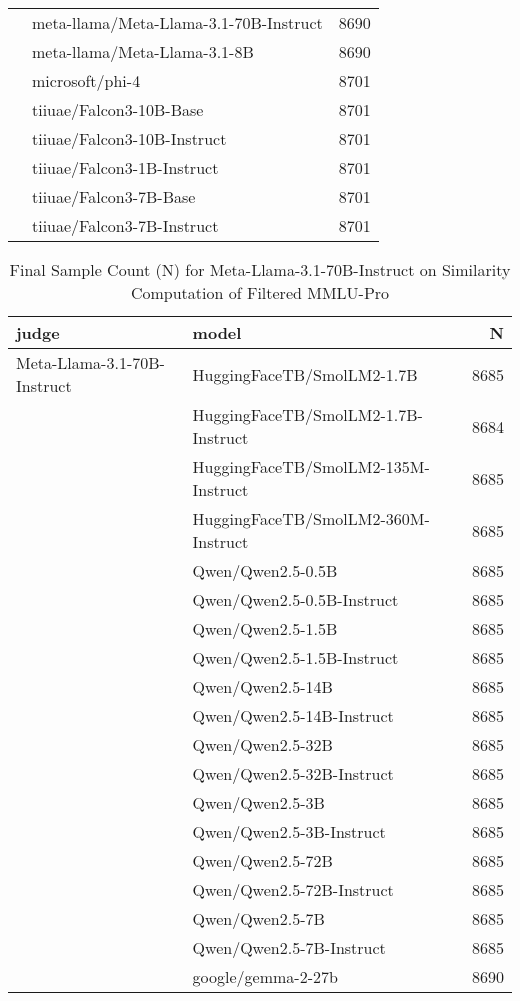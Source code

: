\begin{table}[]
\begin{tabular}{llr}
 & meta-llama/Meta-Llama-3.1-70B-Instruct & 8690 \\
 & meta-llama/Meta-Llama-3.1-8B & 8690 \\
 & microsoft/phi-4 & 8701 \\
 & tiiuae/Falcon3-10B-Base & 8701 \\
 & tiiuae/Falcon3-10B-Instruct & 8701 \\
 & tiiuae/Falcon3-1B-Instruct & 8701 \\
 & tiiuae/Falcon3-7B-Base & 8701 \\
 & tiiuae/Falcon3-7B-Instruct & 8701 \\
\bottomrule
\end{tabular}
    \label{tab:Meta-Llama-3.1-8B-Instruct}
\end{table}

\begin{table}[]
    \centering
     \caption{Final Sample Count (N) for Meta-Llama-3.1-70B-Instruct on Similarity Computation of Filtered MMLU-Pro}
\begin{tabular}{llr}
\toprule
judge & model & N \\
\midrule
Meta-Llama-3.1-70B-Instruct & HuggingFaceTB/SmolLM2-1.7B & 8685 \\
 & HuggingFaceTB/SmolLM2-1.7B-Instruct & 8684 \\
 & HuggingFaceTB/SmolLM2-135M-Instruct & 8685 \\
 & HuggingFaceTB/SmolLM2-360M-Instruct & 8685 \\
 & Qwen/Qwen2.5-0.5B & 8685 \\
 & Qwen/Qwen2.5-0.5B-Instruct & 8685 \\
 & Qwen/Qwen2.5-1.5B & 8685 \\
 & Qwen/Qwen2.5-1.5B-Instruct & 8685 \\
 & Qwen/Qwen2.5-14B & 8685 \\
 & Qwen/Qwen2.5-14B-Instruct & 8685 \\
 & Qwen/Qwen2.5-32B & 8685 \\
 & Qwen/Qwen2.5-32B-Instruct & 8685 \\
 & Qwen/Qwen2.5-3B & 8685 \\
 & Qwen/Qwen2.5-3B-Instruct & 8685 \\
 & Qwen/Qwen2.5-72B & 8685 \\
 & Qwen/Qwen2.5-72B-Instruct & 8685 \\
 & Qwen/Qwen2.5-7B & 8685 \\
 & Qwen/Qwen2.5-7B-Instruct & 8685 \\
 & google/gemma-2-27b & 8690 \\

\end{tabular}
\end{table}
